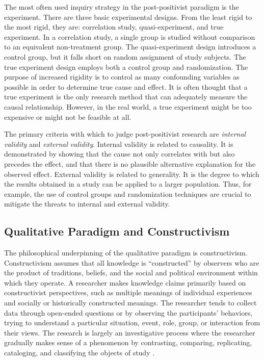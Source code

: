 The most often used inquiry strategy in the post-positivist paradigm is the experiment. There are three basic experimental designs. From the least rigid to the most rigid, they are: correlation study, quasi-experiment, and true experiment. In a correlation study, a single group is studied without comparison to an equivalent non-treatment group. The quasi-experiment design introduces a control group, but it falls short on random assignment of study subjects.  The true experiment design employs both a control group and randomization. The purpose of increased rigidity is to control as many confounding variables as possible in order to determine true cause and effect. It is often thought that a true experiment is the only research method that can adequately measure the causal relationship. However, in the real world, a true experiment might be too expensive or might not be feasible at all.

The primary criteria with which to judge post-positivist research are \textit{internal validity} and \textit{external validity}. 
Internal validity is related to causality. It is demonstrated by showing that the cause not only correlates with but also precedes the effect, and that there is no plausible alternative explanation for the observed effect. 
External validity is related to generality. It is the degree to which the results obtained in a study can be applied to a larger population. 
Thus, for example, the use of control groups and randomization techniques are crucial to mitigate the threats to internal and external validity.








\subsection{Qualitative Paradigm and Constructivism}

The philosophical underpinning of the qualitative paradigm is constructivism. Constructivism assumes that all knowledge is ``constructed'' by observers who are the product of traditions, beliefs, and the social and political environment within which they operate. A researcher makes knowledge claims primarily based on constructivist perspectives, such as multiple meanings of individual experiences and socially or historically constructed meanings. The researcher tends to collect data through open-ended questions or by observing the participants' behaviors, trying to understand a particular situation, event, role, group, or interaction from their views. The research is largely an investigative process where the researcher gradually makes sense of a phenomenon by contrasting, comparing, replicating, cataloging, and classifying the objects of study \cite{Miles:1994}.

